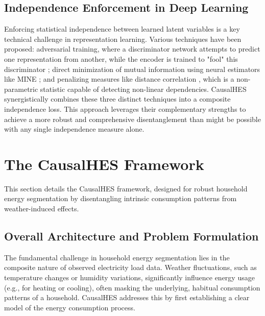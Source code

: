 \documentclass[journal]{IEEEtran}
\begin{document}
\subsection{Independence Enforcement in Deep Learning}
Enforcing statistical independence between learned latent variables is a key technical challenge in representation learning. Various techniques have been proposed: adversarial training, where a discriminator network attempts to predict one representation from another, while the encoder is trained to "fool" this discriminator \cite{adversarial_independence}; direct minimization of mutual information using neural estimators like MINE \cite{belghazi2018mine}; and penalizing measures like distance correlation \cite{szekely2007measuring}, which is a non-parametric statistic capable of detecting non-linear dependencies. CausalHES synergistically combines these three distinct techniques into a composite independence loss. This approach leverages their complementary strengths to achieve a more robust and comprehensive disentanglement than might be possible with any single independence measure alone.

\section{The CausalHES Framework}
    This section details the CausalHES framework, designed for robust household energy segmentation
    by disentangling intrinsic consumption patterns from weather-induced effects.

\subsection{Overall Architecture and Problem Formulation}
The fundamental challenge in household energy segmentation lies in the composite nature of observed electricity load data. Weather fluctuations, such as temperature changes or humidity variations, significantly influence energy usage (e.g., for heating or cooling), often masking the underlying, habitual consumption patterns of a household. CausalHES addresses this by first establishing a clear model of the energy consumption process.
\end{document}
